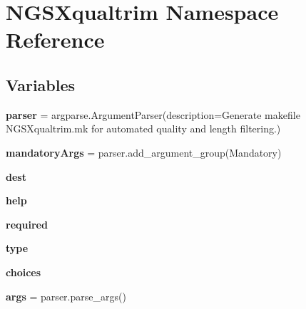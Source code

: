 \hypertarget{namespaceNGSXqualtrim}{}\section{N\+G\+S\+Xqualtrim Namespace Reference}
\label{namespaceNGSXqualtrim}
\subsection*{Variables}
\begin{DoxyCompactItemize}
\item 
{\bfseries parser} = argparse.\+Argument\+Parser(description=\textquotesingle{}Generate makefile N\+G\+S\+Xqualtrim.\+mk for automated quality and length filtering.\textquotesingle{})\hypertarget{namespaceNGSXqualtrim_ae8eb81f01f0b3154629603e42a4e0454}{}\label{namespaceNGSXqualtrim_ae8eb81f01f0b3154629603e42a4e0454}

\item 
{\bfseries mandatory\+Args} = parser.\+add\+\_\+argument\+\_\+group(\textquotesingle{}Mandatory\textquotesingle{})\hypertarget{namespaceNGSXqualtrim_a59be852dff1f6481835e1789c982b8c0}{}\label{namespaceNGSXqualtrim_a59be852dff1f6481835e1789c982b8c0}

\item 
{\bfseries dest}\hypertarget{namespaceNGSXqualtrim_a70ce498db6a1c775777a9c17b33360b4}{}\label{namespaceNGSXqualtrim_a70ce498db6a1c775777a9c17b33360b4}

\item 
{\bfseries help}\hypertarget{namespaceNGSXqualtrim_a11ad2af270b1954f97b21e6dd87970c2}{}\label{namespaceNGSXqualtrim_a11ad2af270b1954f97b21e6dd87970c2}

\item 
{\bfseries required}\hypertarget{namespaceNGSXqualtrim_a99faecd656f629c9ea286a85f482cc1d}{}\label{namespaceNGSXqualtrim_a99faecd656f629c9ea286a85f482cc1d}

\item 
{\bfseries type}\hypertarget{namespaceNGSXqualtrim_a76baf83f8fb73cf2c5611ba52917c0b6}{}\label{namespaceNGSXqualtrim_a76baf83f8fb73cf2c5611ba52917c0b6}

\item 
{\bfseries choices}\hypertarget{namespaceNGSXqualtrim_abee5be1a0acbbf9c496083998a172477}{}\label{namespaceNGSXqualtrim_abee5be1a0acbbf9c496083998a172477}

\item 
{\bfseries args} = parser.\+parse\+\_\+args()\hypertarget{namespaceNGSXqualtrim_a2c84f1a1300f839a4065b6fdab40ea16}{}\label{namespaceNGSXqualtrim_a2c84f1a1300f839a4065b6fdab40ea16}


\end{DoxyCompactItemize}
